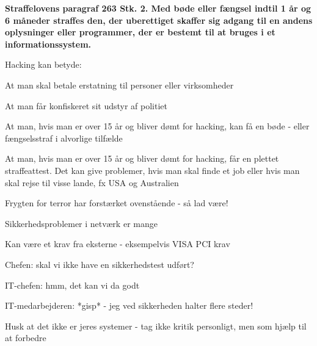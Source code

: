 \documentclass[20pt,landscape,a4paper,footrule]{foils}
\begin{document}
{\bfseries Straffelovens paragraf 263 Stk. 2. Med bøde eller fængsel indtil 1 år og 6 måneder straffes den, der uberettiget skaffer sig adgang til en andens oplysninger eller programmer, der er bestemt til at bruges i et informationssystem. }

Hacking kan betyde:
\begin{list2}
\item At man skal betale erstatning til personer eller virksomheder
\item At man får konfiskeret sit udstyr af politiet
\item At man, hvis man er over 15 år og bliver dømt for hacking, kan
  få en bøde - eller fængselsstraf i alvorlige tilfælde 
\item At man, hvis man er over 15 år og bliver dømt for hacking, får
en plettet straffeattest. Det kan give problemer, hvis man skal finde
et job eller hvis man skal rejse til visse lande, fx USA og
Australien
\item Frygten for terror har forstærket ovenstående - så lad være!
\end{list2}






\begin{list1}
\item Sikkerhedsproblemer i netværk er mange
\item Kan være et krav fra eksterne - eksempelvis VISA PCI krav
\end{list1}

\begin{list1}
\item Chefen: skal vi ikke have en sikkerhedstest udført?
\item IT-chefen: hmm, det kan vi da godt
\item IT-medarbejderen: *gisp* - jeg ved sikkerheden halter flere steder!  
\item Husk at det ikke er jeres systemer - tag ikke kritik personligt,
men som hjælp til at forbedre
\end{list1}




\end{document}
